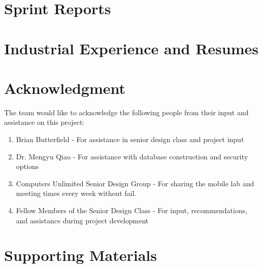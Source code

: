 \documentclass{book}
\begin{document}
\chapter{Sprint Reports}


\chapter{Industrial Experience and Resumes}


\chapter{Acknowledgment}
\label{SpecialThanks}  
The team would like to acknowledge the following people from their input and assistance on this project:

\begin{enumerate}
\item Brian Butterfield - For assistance in senior design class and project input
\item Dr. Mengyu Qiao - For assistance with database construction and security options
\item Computers Unlimited Senior Design Group - For sharing the mobile lab and meeting times every week without fail.
\item Fellow Members of the Senior Design Class - For input, recommendations, and assistance during project development
\end{enumerate}  

\chapter{Supporting Materials}


\backmatter

%
\end{document}
